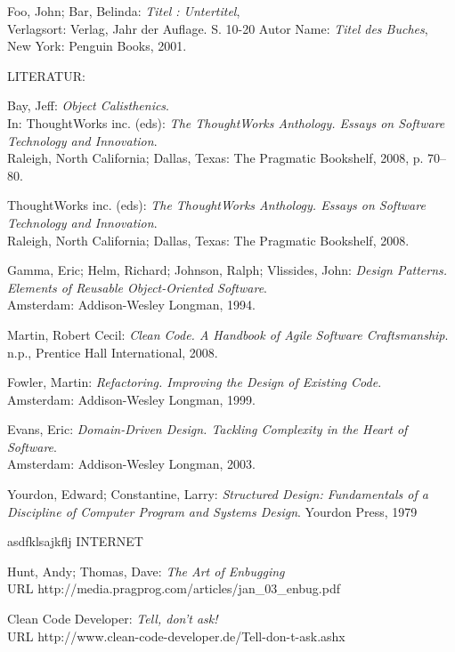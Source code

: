 \documentclass[12pt,a4paper,oneside, 
liststotoc, 					%
bibtotoc,						%
titlepage, 						%
headsepline, 					%
BCOR6mm,						%
english
]{scrreprt}
\begin{document}
\begin{thebibliography}{999999}

 Foo, John; Bar, Belinda: \emph{Titel : Untertitel},\\ Verlagsort: Verlag, Jahr der Auflage. S. 10-20
 Autor Name: \emph{Titel des Buches}, New York: Penguin Books, 2001.

LITERATUR: 

 Bay, Jeff: 
\emph{Object Calisthenics}. \\ In: ThoughtWorks inc. (eds): 
\emph{The ThoughtWorks Anthology. Essays on Software Technology and Innovation}. \\ Raleigh, North California; Dallas, Texas: The Pragmatic Bookshelf, 2008, p. 70--80.

 ThoughtWorks inc. (eds): 
\emph{The ThoughtWorks Anthology. Essays on Software Technology and Innovation}. \\ Raleigh, North California; Dallas, Texas: The Pragmatic Bookshelf, 2008.

 Gamma, Eric; Helm, Richard; Johnson, Ralph; Vlissides,  John:
\emph{Design Patterns. Elements of Reusable Object-Oriented Software}. \\ Amsterdam: Addison-Wesley Longman, 1994.
  
 Martin, Robert Cecil:
\emph{Clean Code. A Handbook of Agile Software Craftsmanship}. \\ n.p., Prentice Hall International, 2008.

 Fowler, Martin:
\emph{Refactoring. Improving the Design of Existing Code}. \\ Amsterdam: Addison-Wesley Longman, 1999. 

 Evans, Eric:
\emph{Domain-Driven Design. Tackling Complexity in the Heart of Software}. \\ Amsterdam: Addison-Wesley Longman, 2003. 

 Yourdon, Edward; Constantine, Larry:
\emph{Structured Design: Fundamentals of a Discipline of Computer Program and Systems Design}. Yourdon Press, 1979

asdfklsajkflj INTERNET

 Hunt, Andy; Thomas, Dave:
\emph{The Art of Enbugging} \\ URL http://media.pragprog.com/articles/jan_03_enbug.pdf

 Clean Code Developer:
\emph{Tell, don't ask!} \\ URL http://www.clean-code-developer.de/Tell-don-t-ask.ashx


\end{thebibliography}
\end{document}
